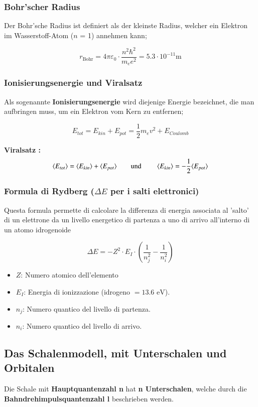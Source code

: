 \subsubsection{Bohr'scher Radius}
Der Bohr’sche Radius ist definiert als der kleinste Radius, welcher ein Elektron im
Wasserstoff-Atom ($n$ = 1) annehmen kann;

$$r_{\text{Bohr}} = 4\pi\varepsilon_0\cdot\frac{n^2 \hbar^{2}}{m_{e}e^{2}} = 5.3\cdot10^{-11}\text{m}$$

\subsubsection{Ionisierungsenergie und Viralsatz}
Als sogenannte \textbf{Ionisierungsenergie} wird diejenige Energie bezeichnet, die man aufbringen
muss, um ein Elektron vom Kern zu entfernen;

$$E_{tot} = E_{kin} + E_{pot} = \frac{1}{2}m_{e}v^{2} + E_{Coulomb}$$

\textbf{Viralsatz :}
$$\langle E_{tot}\rangle = \langle E_{kin}\rangle + \langle E_{pot}\rangle  \text{\qquad und \qquad} \langle E_{kin}\rangle = - \frac{1}{2}\langle E_{pot}\rangle$$

\subsubsection{Formula di Rydberg ($\Delta E$ per i salti elettronici)}
Questa formula permette di calcolare la differenza di energia associata al 'salto' di un elettrone da un livello energetico di partenza a uno di arrivo all'interno di un atomo idrogenoide

\begin{minipage}{0.35\columnwidth}
	$$\Delta E = -Z^2 \cdot E_I \cdot \left(\frac{1}{n_j^2} - \frac{1}{n_i^2}\right)$$
\end{minipage}
\hfill
\begin{minipage}{0.63\columnwidth}
	\begin{itemize}
    \item $Z$: Numero atomico dell'elemento
    \item $E_I$: Energia di ionizzazione (idrogeno $= 13.6 \text{ eV}$).
    \item $n_j$: Numero quantico del livello di partenza.
    \item $n_i$: Numero quantico del livello di arrivo.
\end{itemize}
\end{minipage}

\subsection{Das Schalenmodell, mit Unterschalen und Orbitalen}
Die Schale mit \textbf{Hauptquantenzahl n} hat \textbf{n Unterschalen}, welche durch die \textbf{Bahndrehimpulsquantenzahl l} beschrieben werden.

